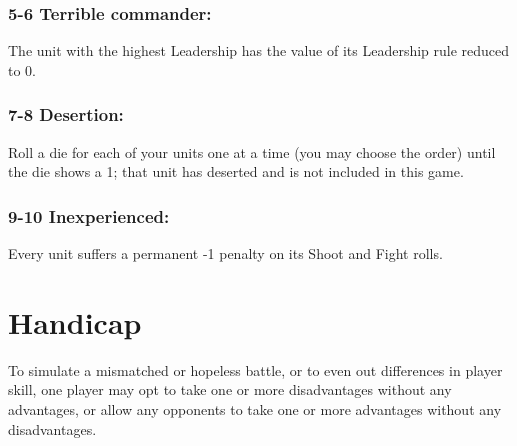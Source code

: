 \begin{multicols}{2}
\subsubsection*{5-6 Terrible commander:} The unit with the highest Leadership has the value of its Leadership rule reduced to 0.

\subsubsection*{7-8 Desertion:} Roll a die for each of your units one at a time (you may choose the order) until the die shows a 1; that unit has deserted and is not included in this game.

\subsubsection*{9-10 Inexperienced:} Every unit suffers a permanent -1 penalty on its Shoot and Fight rolls.




\section*{Handicap}
To simulate a mismatched or hopeless battle, or to even out differences in player skill, one player may opt to take one or more disadvantages without any advantages,  or allow any opponents to take one or more advantages without any disadvantages.

\end{multicols}

